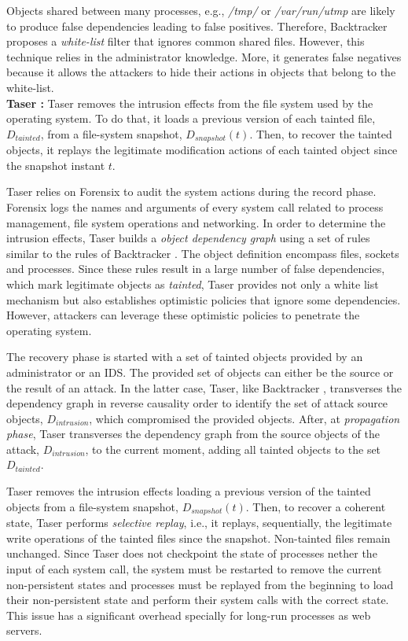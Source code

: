 Objects shared between many processes, e.g., \textit{/tmp/} or \textit{/var/run/utmp} are likely to produce false dependencies leading to false positives. Therefore, Backtracker proposes a \textit{white-list} filter that ignores common shared files. However, this technique relies in the administrator knowledge. More, it generates false negatives because it allows the attackers to hide their actions in objects that belong to the white-list. \\


\textbf{Taser \cite{taser}:} Taser removes the intrusion effects from the file system used by the operating system. To do that, it loads a previous version of each tainted file, $D_{tainted}$, from a file-system snapshot, $D_{snapshot}(t)$. Then, to recover the tainted objects, it replays the legitimate modification actions of each tainted object since the snapshot instant $t$.

Taser relies on Forensix \cite{forensix} to audit the system actions during the record phase. Forensix logs the names and arguments of every system call related to process management, file system operations and networking. In order to determine the intrusion effects, Taser builds a \textit{object dependency graph} using a set of rules similar to the rules of Backtracker \cite{backtracker}. The object definition encompass files, sockets and processes. Since these rules result in a large number of false dependencies, which mark legitimate objects as \textit{tainted}, Taser provides not only a white list mechanism but also establishes optimistic policies that ignore some dependencies. However, attackers can leverage these optimistic policies to penetrate the operating system.

The recovery phase is started with a set of tainted objects provided by an administrator or an IDS. The provided set of objects can either be the source or the result of an attack. In the latter case, Taser, like Backtracker \cite{backtracker}, transverses the dependency graph in reverse causality order to identify the set of attack source objects, $D_{intrusion}$, which compromised the provided objects. After, at \textit{propagation phase}, Taser transverses the dependency graph from the source objects of the attack, $D_{intrusion}$, to the current moment, adding all tainted objects to the set $D_{tainted}$.

Taser removes the intrusion effects loading a previous version of the tainted objects from a file-system snapshot, $D_{snapshot}(t)$. Then, to recover a coherent state, Taser performs \textit{selective replay}, i.e., it replays, sequentially, the legitimate write operations of the tainted files since the snapshot. Non-tainted files remain unchanged. Since Taser does not checkpoint the state of processes nether the input of each system call, the system must be restarted to remove the current non-persistent states and processes must be replayed from the beginning to load their non-persistent state and perform their system calls with the correct state. This issue has a significant overhead specially for long-run processes as web servers.

